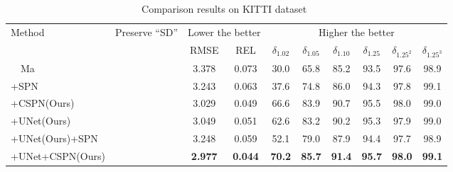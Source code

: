 \begin{table}[!htpb]
	\centering
	\caption{Comparison results on KITTI dataset~\cite{geiger2012we} 
	}
	\label{tbl:sota_kitti}
	\fontsize{7.5}{7.5}\selectfont
	\bgroup
	\def\arraystretch{1.3}
	\setlength{\tabcolsep}{4.5pt} %
    \begin{tabular}{lccccccccc}
	\hline
		\multicolumn{1}{l}{\multirow{2}{*}{Method}}  & \multirow{2}{*}{Preserve ``SD''} & \multicolumn{2}{c}{Lower the better}   & \multicolumn{6}{c}{Higher the better} \\ \cline{3-10}
		\multicolumn{1}{l}{} & & RMSE  & \multicolumn{1}{c|}{REL} & $\delta_{1.02}$ & $\delta_{1.05}$ & $\delta_{1.10}$ & $\delta_{1.25}$ & $\delta_{1.25^2}$ & $\delta_{1.25^3}$ \\ \hline
	~~Ma \etal ~\cite{Ma2017SparseToDense}                    &                                 & 3.378                                 & 0.073                    & 30.0            & 65.8            & 85.2            & 93.5            & 97.6              & 98.9              \\ \hline
	+SPN~\cite{liu2016learning}                   & \checkmark                                & 3.243                                 & 0.063                    & 37.6            & 74.8            & 86.0            & 94.3            & 97.8              & 99.1              \\ \hline
	+CSPN(Ours)            & \checkmark                                & 3.029                                 & 0.049                    & 66.6            & 83.9            & 90.7            & 95.5            & 98.0              & 99.0              \\ \hline
	+UNet(Ours)            &                              & 3.049                                 & 0.051                    & 62.6            & 83.2            & 90.2            & 95.3            & 97.9              & 99.0              \\ \hline
	+UNet(Ours)+SPN        & \checkmark                               & 3.248                                 & 0.059                    & 52.1            & 79.0            & 87.9            & 94.4            & 97.7              & 98.9              \\ \hline
	+UNet+CSPN(Ours)       & \checkmark                                & \textbf{2.977}                        & \textbf{0.044}           & \textbf{70.2}   & \textbf{85.7}   & \textbf{91.4}   & \textbf{95.7}   & \textbf{98.0}     & \textbf{99.1}     \\ \hline
    \end{tabular}
	\egroup
\label{tbl:sota_kitti}
\end{table}

